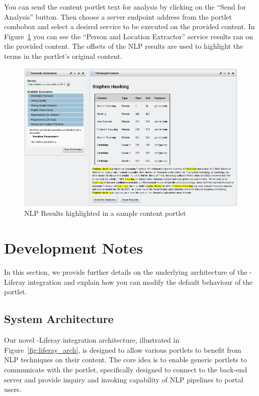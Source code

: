 You can send the content portlet text for analysis by clicking on the ``Send for Analysis'' button. Then choose a server endpoint address from the \sa portlet combobox and select a desired service to be executed on the provided content. In Figure~\ref{fig:liferay_results_portlet} you can see the ``Person and Location Extractor'' service results ran on the provided content. The offsets of the NLP results are used to highlight the terms in the portlet's original content.

\begin{figure}
\centering
\includegraphics[scale=0.6]{pictures/liferay_results_portlet.png}
\caption{NLP Results highlighted in a sample content portlet}
\label{fig:liferay_results_portlet}
\end{figure}

\section{Development Notes}
In this section, we provide further details on the underlying architecture of the \sa-Liferay integration and explain how you can modify the default behaviour of the \sa portlet.

\subsection{System Architecture}
Our novel \sa-Liferay integration architecture, illustrated in Figure~\ref{fig:liferay_arch}, is designed to allow various portlets to benefit from NLP techniques on their content. The core idea is to enable generic portlets to communicate with the \sa portlet, specifically designed to connect to the back-end \sa server and provide inquiry and invoking capability of NLP pipelines to portal users. 


